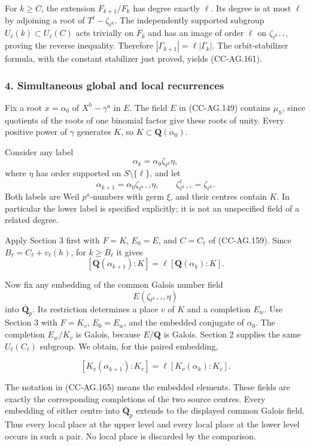 For \(k\ge C\), the extension \(F_{k+1}/F_k\) has degree exactly
\(\ell\). Its degree is at most \(\ell\) by adjoining a root of
\(T^\ell-\zeta_{\ell^k}\). The independently supported subgroup
\(U_\ell(k)\subset U_\ell(C)\) acts trivially on \(F_k\) and has an
image of order \(\ell\) on \(\zeta_{\ell^{k+1}}\), proving the reverse
inequality. Therefore \(|\Gamma_{k+1}|=\ell|\Gamma_k|\). The
orbit-stabilizer formula, with the constant stabilizer just proved,
yields (CC-AG.161).

\subsubsection{4. Simultaneous global and local
recurrences}\label{simultaneous-global-and-local-recurrences}

Fix a root \(x=\alpha_0\) of \(X^h-\gamma^a\) in \(E\). The field \(E\)
in (CC-AG.149) contains \(\mu_h\), since quotients of the roots of one
binomial factor give these roots of unity. Every positive power of
\(\gamma\) generates \(K\), so \(K\subset\mathbf Q(\alpha_0)\).

Consider any label \[
 \alpha_k=\alpha_0\zeta_{\ell^k}\eta,
\] where \(\eta\) has order supported on \(S\setminus\{\ell\}\), and let
\[
 \alpha_{k+1}=\alpha_0\zeta_{\ell^{k+1}}\eta,
 \qquad \zeta_{\ell^{k+1}}^\ell=\zeta_{\ell^k}.
 \tag{CC-AG.163}
\] Both labels are Weil \(p^a\)-numbers with germ \(\xi\), and their
centres contain \(K\). In particular the lower label is specified
explicitly; it is not an unspecified field of a related degree.

Apply Section 3 first with \(F=K\), \(E_0=E\), and \(C=C_\ell\) of
(CC-AG.159). Since \(B_\ell=C_\ell+v_\ell(h)\), for \(k\ge B_\ell\) it
gives \[
 [\mathbf Q(\alpha_{k+1}):K]
            =\ell[\mathbf Q(\alpha_k):K].
 \tag{CC-AG.164}
\]

Now fix any embedding of the common Galois number field \[
                 E(\zeta_{\ell^{k+1}},\eta)
\] into \(\overline{\mathbf Q}_p\). Its restriction determines a place
\(v\) of \(K\) and a completion \(E_w\). Use Section 3 with \(F=K_v\),
\(E_0=E_w\), and the embedded conjugate of \(\alpha_0\). The completion
\(E_w/K_v\) is Galois, because \(E/\mathbf Q\) is Galois. Section 2
supplies the same \(U_\ell(C_\ell)\) subgroup. We obtain, for this
paired embedding,

\[
 [K_v(\alpha_{k+1}):K_v]
                =\ell[K_v(\alpha_k):K_v].
 \tag{CC-AG.165}
\]

The notation in (CC-AG.165) means the embedded elements. These fields
are exactly the corresponding completions of the two source centres.
Every embedding of either centre into \(\overline{\mathbf Q}_p\) extends
to the displayed common Galois field. Thus every local place at the
upper level and every local place at the lower level occurs in such a
pair. No local place is discarded by the comparison.

